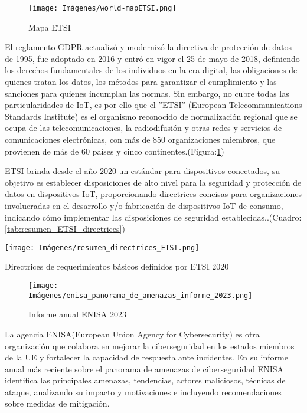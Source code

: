 \begin{figure}[ht]%
    \centering
    \texttt{[image: Imágenes/world-mapETSI.png]}
    \caption{Mapa ETSI}
    \label{fig:world-map}
\end{figure}

El reglamento GDPR actualizó y modernizó la directiva de protección de datos de 1995, fue adoptado en 2016 y entró en vigor el 25 de mayo de 2018, definiendo los derechos fundamentales de los individuos en la era digital, las obligaciones de quienes tratan los datos, los métodos para garantizar el cumplimiento y las sanciones para quienes incumplan las normas. Sin embargo, no cubre todas las particularidades de IoT, es por ello que el ''ETSI'' (European Telecommunications Standards Institute) es el organismo reconocido de normalización regional que se ocupa de las telecomunicaciones, la radiodifusión y otras redes y servicios de comunicaciones electrónicas, con más de 850 organizaciones miembros, que provienen de más de 60 países y cinco continentes.(Figura:\ref{fig:world-map})


ETSI brinda desde el año 2020 un estándar para dispositivos conectados, su objetivo es establecer disposiciones de alto nivel para la seguridad y protección de datos en dispositivos IoT, proporcionando directrices concisas para organizaciones involucradas en el desarrollo y/o fabricación de dispositivos IoT de consumo, indicando cómo implementar las disposiciones de seguridad establecidas.\cite{ETSI_EN303645_2020}.(Cuadro: \ref{tab:resumen_ETSI_directrices})

\begin{table}[ht]
    \centering
        \texttt{[image: Imágenes/resumen\_directrices\_ETSI.png]} 
    \caption{Directrices de requerimientos básicos definidos por ETSI 2020}
    \label{tab:resumen_ETSI_directrices}
\end{table}

\begin{figure}[ht]%
   \centering
    \texttt{[image: Imágenes/enisa\_panorama\_de\_amenazas\_informe\_2023.png]}
    \caption{Informe anual ENISA 2023}
    \label{fig:informe-Panorama-de-amenazas-ENISA}
\end{figure}

La agencia ENISA(European Union Agency for Cybersecurity) es otra organización que colabora en mejorar la ciberseguridad en los estados miembros de la UE y fortalecer la capacidad de respuesta ante incidentes. En su informe anual más reciente sobre el panorama de amenazas de ciberseguridad ENISA identifica las principales amenazas, tendencias, actores maliciosos, técnicas de ataque, analizando su impacto y motivaciones e incluyendo recomendaciones sobre medidas de mitigación.\cite{enisa2023}


